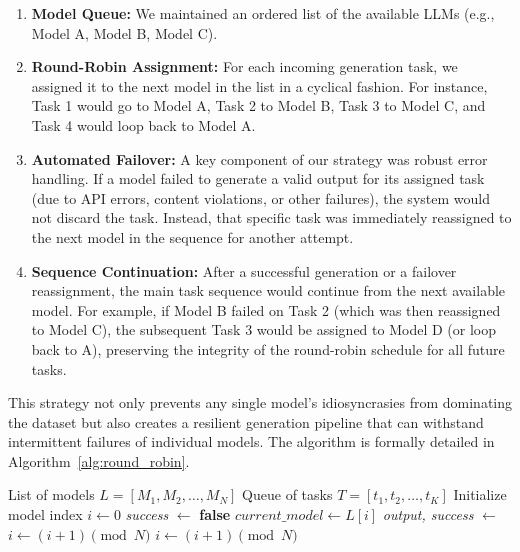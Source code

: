 \documentclass[letterpaper]{article} %
\begin{document}
\begin{enumerate}
    \item \textbf{Model Queue:} We maintained an ordered list of the available LLMs (e.g., Model A, Model B, Model C).
    \item \textbf{Round-Robin Assignment:} For each incoming generation task, we assigned it to the next model in the list in a cyclical fashion. For instance, Task 1 would go to Model A, Task 2 to Model B, Task 3 to Model C, and Task 4 would loop back to Model A.
    \item \textbf{Automated Failover:} A key component of our strategy was robust error handling. If a model failed to generate a valid output for its assigned task (due to API errors, content violations, or other failures), the system would not discard the task. Instead, that specific task was immediately reassigned to the next model in the sequence for another attempt.
    \item \textbf{Sequence Continuation:} After a successful generation or a failover reassignment, the main task sequence would continue from the next available model. For example, if Model B failed on Task 2 (which was then reassigned to Model C), the subsequent Task 3 would be assigned to Model D (or loop back to A), preserving the integrity of the round-robin schedule for all future tasks.
\end{enumerate}
This strategy not only prevents any single model's idiosyncrasies from dominating the dataset but also creates a resilient generation pipeline that can withstand intermittent failures of individual models. The algorithm is formally detailed in Algorithm~\ref{alg:round_robin}.

\begin{algorithm}[ht!]
\caption{Round-Robin Generation with Failover}
\label{alg:round_robin}
\begin{algorithmic}[1]
\Require List of models $L = [M_1, M_2, \dots, M_N]$
\Require Queue of tasks $T = [t_1, t_2, \dots, t_K]$
\State Initialize model index $i \gets 0$
    \State \textit{success} $\gets$ \textbf{false}
        \State $current\_model \gets L[i]$
        \State \textit{output, success} $\gets$ 
            \State $i \gets (i + 1) \pmod{N}$
        \EndIf
    \EndWhile
    \State $i \gets (i + 1) \pmod{N}$
\EndFor
\end{algorithmic}
\end{algorithm}
\end{document}
